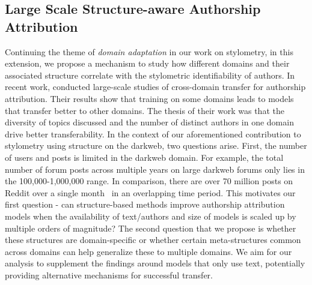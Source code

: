 \subsection{Large Scale Structure-aware Authorship Attribution}
Continuing the theme of \textit{domain adaptation} in our work on stylometry, in this extension, we propose a mechanism to study how different domains and their associated structure correlate with the stylometric identifiability of authors.
In recent work, \citet{barlas2020cross,riverastao2021learning} conducted large-scale studies of cross-domain transfer for authorship attribution. 
Their results show that training on some domains leads to models that transfer better to other domains.
The thesis of their work was that the diversity of topics discussed and the number of distinct authors in one domain drive better transferability.
In the context of our aforementioned contribution to stylometry using structure on the darkweb, two questions arise.
First, the number of users and posts is limited in the darkweb domain. 
For example, the total number of forum posts across multiple years on large darkweb forums only lies in the 100,000-1,000,000 range.
In comparison, there are over 70 million posts on Reddit over a single month~\citep{andrews2019learning} in an overlapping time period.
This motivates our first question - can structure-based methods improve authorship attribution models when the availability of text/authors and size of models is scaled up by multiple orders of magnitude?
The second question that we propose is whether these structures are domain-specific or whether certain meta-structures common across domains can help generalize these to multiple domains.
We aim for our analysis to supplement the findings around models that only use text, potentially providing alternative mechanisms for successful transfer.



